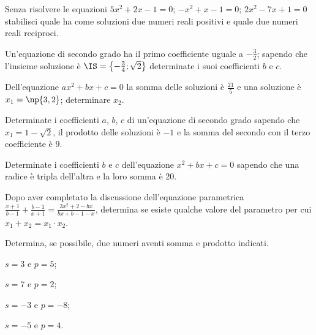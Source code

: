 \begin{esercizio}
 \label{ese:3.71}
Senza risolvere le equazioni $ 5 x^{2} + 2 x-1 = 0$; $-x^{2} + x-1 = 0$; $2 x^{2}-7 x +1 = 0$ stabilisci quale ha come soluzioni due numeri reali positivi e quale due numeri reali reciproci.
\end{esercizio}

\begin{esercizio}
 \label{ese:3.72}
Un'equazione di secondo grado ha il primo coefficiente uguale a $- \frac{3}{2}$; sapendo che l'insieme soluzione è $\IS = \left\{-\frac{3}{4};\sqrt{2} \right\}$
determinate i suoi coefficienti $b$ e $c$.
\end{esercizio}

\begin{esercizio}
 \label{ese:3.73}
Dell'equazione $a x^{2} + b x + c = 0$ la somma delle soluzioni è $\frac{21}{5}$ e una soluzione è $x_{1} = \np{3,2}$; determinare $x_{2}$.
\end{esercizio}

\begin{esercizio}
 \label{ese:3.74}
Determinate i coefficienti $a$, $b$, $c$ di un'equazione di secondo grado sapendo che $x_{1} = 1-\sqrt{2}$, il prodotto delle soluzioni è $-1$
e la somma del secondo con il terzo coefficiente è $9$.
\end{esercizio}

\begin{esercizio}
 \label{ese:3.75}
Determinate i coefficienti $b$ e $c$ dell'equazione $x^{2} + b x + c = 0$ sapendo che una radice è tripla dell'altra e la loro somma è 20.
\end{esercizio}

\begin{esercizio}[\Ast]
 \label{ese:3.76}
Dopo aver completato la discussione dell'equazione parametrica $\frac{x + 1}{b-1} + \frac{b-1}{x + 1}=\frac{3 x^{2} + 2-b x}{b x + b-1-x}$, determina se esiste qualche valore del parametro per cui $x_{1} + x_{2} = x_{1} \cdot x_{2}$.
\end{esercizio}

\begin{esercizio}
 \label{ese:3.77}
Determina, se possibile, due numeri aventi somma e prodotto indicati.
\begin{multicols}{2}
\begin{enumeratea}
\item $s = 3 \text{ e } p = 5$;
\item $s = 7 \text{ e } p = 2$;
\item $s =-3 \text{ e } p =-8$;
\item $s =-5 \text{ e } p = 4$.
\end{enumeratea}
\end{multicols}
\end{esercizio}

